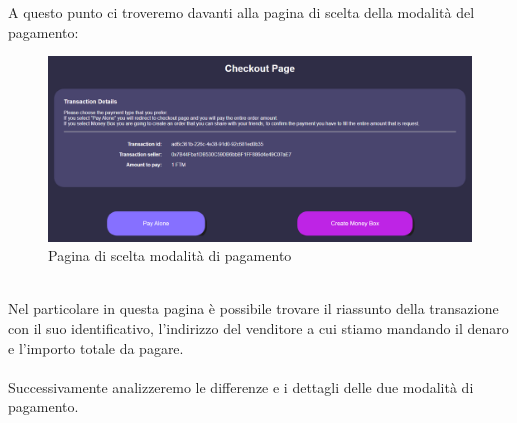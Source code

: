         A questo punto ci troveremo davanti alla pagina di scelta della modalità del pagamento:
        \begin{figure}[H]
            \centering
            \includegraphics[scale=0.4]{immagini/Checkout/PaymentMode.png}
            \caption{Pagina di scelta modalità di pagamento}
        \end{figure}
        \textbf{}\\
        Nel particolare in questa pagina è possibile trovare il riassunto della transazione con  il suo identificativo, l'indirizzo del venditore a cui stiamo mandando il denaro e l'importo totale da pagare.\\\\
        Successivamente analizzeremo le differenze e i dettagli delle due modalità di pagamento.
